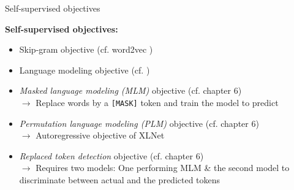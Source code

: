 
\begin{vbframe}{Self-supervised objectives}

\vfill

\textbf{Self-supervised objectives:}
	
	\begin{itemize}
		\item Skip-gram objective (cf. word2vec \href{https://arxiv.org/pdf/1301.3781.pdf}{})
		\item Language modeling objective (cf. \href{http://www.jmlr.org/papers/volume3/bengio03a/bengio03a.pdf}{})
		\item \textit{Masked language modeling (MLM)} objective (cf. chapter 6)\\
					$\rightarrow$ Replace words by a \texttt{[MASK]} token and train the model to predict
		\item \textit{Permutation language modeling (PLM)} objective (cf. chapter 6)\\
					$\rightarrow$ Autoregressive objective of XLNet
		\item \textit{Replaced token detection} objective (cf. chapter 6)\\
					$\rightarrow$ Requires two models: One performing MLM \& the second model to discriminate between actual and the predicted tokens
	\end{itemize}
\vfill

\end{vbframe}


\endlecture

